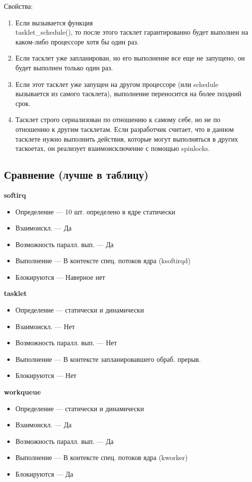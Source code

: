 Свойства:
\begin{enumerate}
	\item Если вызывается функция \\ tasklet\_schedule(), то после этого тасклет гарантированно будет выполнен на каком-либо процессоре хотя бы один раз. 
	\item Если тасклет уже запланирован, но его выполнение все еще не запущено, он будет выполнен только один раз. 
	\item Если этот тасклет уже запущен на другом процессоре (или schedule вызывается из самого тасклета), выполнение переносится на более поздний срок. 
	\item Тасклет строго сериализован по отношению к самому себе, но не по отношению к другим тасклетам. Если разработчик считает, что в данном тасклете нужно выполнить действия, которые могут выполняться в других таскоетах, он реализует взаимоисключение с помощью spinlocks.
\end{enumerate}

\subsection*{Сравнение (лучше в таблицу)}
\textbf{softirq}
\begin{itemize}
	\item Определение --- 10 шт. определено в ядре статически
	\item Взаимоискл. --- Да
	\item Возможность паралл. вып. --- Да
	\item Выполнение --- В контексте спец. потоков ядра (ksoftirqd)
	\item Блокируются --- Наверное нет
\end{itemize}

\textbf{tasklet}
\begin{itemize}
	\item Определение --- статически и динамически
	\item Взаимоискл. --- Нет
	\item Возможность паралл. вып. --- Нет
	\item Выполнение --- В контексте запланировавшего обраб. прерыв.
	\item Блокируются --- Нет
\end{itemize}

\textbf{workqueue}
\begin{itemize}
	\item Определение --- статически и динамически
	\item Взаимоискл. --- Да
	\item Возможность паралл. вып. --- Да
	\item Выполнение --- В контексте спец. потоков ядра (kworker)
	\item Блокируются --- Да
\end{itemize}


